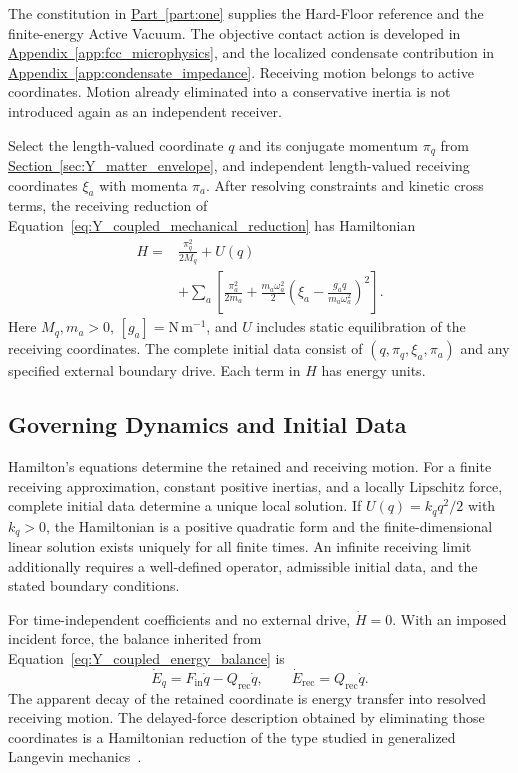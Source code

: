 The constitution in \hyperref[part:one]{Part~\ref*{part:one}} supplies the Hard-Floor reference and the finite-energy Active Vacuum. The objective contact action is developed in \hyperref[app:fcc_microphysics]{Appendix~\ref*{app:fcc_microphysics}}, and the localized condensate contribution in \hyperref[app:condensate_impedance]{Appendix~\ref*{app:condensate_impedance}}. Receiving motion belongs to active coordinates. Motion already eliminated into a conservative inertia is not introduced again as an independent receiver.

Select the length-valued coordinate $q$ and its conjugate momentum $\pi_q$ from \hyperref[sec:Y_matter_envelope]{Section~\ref*{sec:Y_matter_envelope}}, and independent length-valued receiving coordinates $\xi_a$ with momenta $\pi_a$. After resolving constraints and kinetic cross terms, the receiving reduction of Equation~\eqref{eq:Y_coupled_mechanical_reduction} has Hamiltonian
\begin{equation}
\begin{aligned}
 H={}&\frac{\pi_q^2}{2M_q}+U(q)\\
 &+\sum_a\left[
 \frac{\pi_a^2}{2m_a}
 +\frac{m_a\omega_a^2}{2}
 \left(\xi_a-\frac{g_aq}{m_a\omega_a^2}\right)^2
 \right].
\end{aligned}
\label{eq:DMR_parent_hamiltonian}
\end{equation}
Here $M_q,m_a>0$, $[g_a]=\mathrm{N\,m^{-1}}$, and $U$ includes static equilibration of the receiving coordinates. The complete initial data consist of $(q,\pi_q,\xi_a,\pi_a)$ and any specified external boundary drive. Each term in $H$ has energy units.

\subsection{Governing Dynamics and Initial Data}

Hamilton's equations determine the retained and receiving motion. For a finite receiving approximation, constant positive inertias, and a locally Lipschitz force, complete initial data determine a unique local solution. If $U(q)=k_qq^2/2$ with $k_q>0$, the Hamiltonian is a positive quadratic form and the finite-dimensional linear solution exists uniquely for all finite times. An infinite receiving limit additionally requires a well-defined operator, admissible initial data, and the stated boundary conditions.

For time-independent coefficients and no external drive, $\dot H=0$. With an imposed incident force, the balance inherited from Equation~\eqref{eq:Y_coupled_energy_balance} is
\begin{equation}
 \dot E_q=F_{\mathrm{in}}\dot q-Q_{\mathrm{rec}}\dot q,
 \qquad
 \dot E_{\mathrm{rec}}=Q_{\mathrm{rec}}\dot q.
\label{eq:DMR_total_energy_balance}
\end{equation}
The apparent decay of the retained coordinate is energy transfer into resolved receiving motion. The delayed-force description obtained by eliminating those coordinates is a Hamiltonian reduction of the type studied in generalized Langevin mechanics~\cite{DMR_Zwanzig1973}.

